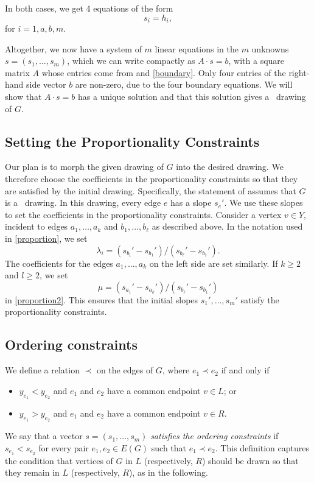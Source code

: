 In both cases, we get 4 equations of the form
\begin{equation}
  \label{eq:boundary}
  s_i = h_i, %
\end{equation}
for $i=1,a,b,m$.


Altogether, we now have a system of $m$ linear equations
in the $m$ unknowns $s=(s_1,\ldots,s_m)$, which we can write
compactly as
$A\cdot s = b$, with a square matrix $A$ whose entries come from
\thetag{\ref{eq:slope0}--\ref{eq:proportion2}}
and \eqref{boundary}.
Only four entries of
the right-hand side vector
$b$
are non-zero, due to the four boundary equations.
We will show that $A\cdot s=b$ has a unique
solution and that this solution gives a \Fary\ drawing of $G$.

\subsection{Setting the Proportionality Constraints}
\label{sec:setting}

 Our plan is to morph the given drawing of $G$
into the desired drawing.
We therefore choose the coefficients in the proportionality constraints
so that they are satisfied by the initial drawing.
Specifically, the statement of  assumes that $G$ is a
\Fary\ drawing.  In this drawing, every edge $e$
has a slope $s_e'$.
We use these slopes to set the
coefficients in the proportionality constraints.
Consider a
vertex $v\in Y$, incident to edges $a_1,\ldots,a_k$ and $b_1,\ldots,b_\ell$
as described above.
In the notation used
in \eqref{proportion}, we set
\[
\lambda_i = (s_{b_i}'-s_{b_1}')/(s_{b_\ell}'-s_{b_1}') .
\]
The coefficients for the edges
 $a_1,\ldots,a_k$ on the left side are set similarly.
If $k\ge2$ and $l\ge 2$,
we set
\[
\mu = (s_{a_1}'-s_{a_k}')/(s_{b_\ell}'-s_{b_1}')
\]
 in \eqref{proportion2}.
This ensures that the initial slopes $s_{1}',\ldots,s_{m}'$ satisfy the
proportionality constraints.


\subsection{Ordering constraints}

We define a relation $\prec$ on the edges of $G$, where $e_1 \prec e_2$ if and only if
\begin{itemize}
	\item $y_{e_1} < y_{e_2}$ and $e_1$ and $e_2$ have a common endpoint $v\in L$; or
	\item $y_{e_1} > y_{e_2}$ and $e_1$ and $e_2$ have a common endpoint $v\in R$.
\end{itemize}
We say that a vector $s=(s_1,\ldots,s_m)$ \emph{satisfies the ordering
	constraints} if $s_{e_1} < s_{e_2}$ for every pair $e_1,e_2\in E(G)$
such that $e_1\prec e_2$. This definition captures the condition that vertices of $G$ in $L$ (respectively, $R$) should be drawn so that they remain in $L$ (respectively, $R$), as in the following. 

